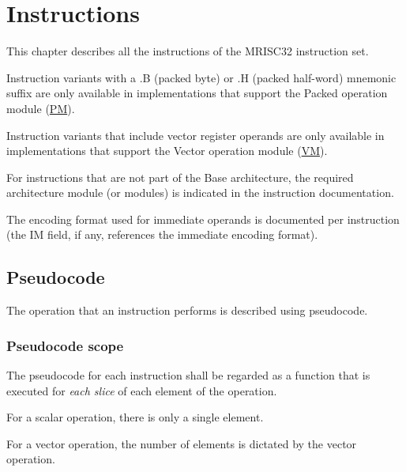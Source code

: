 %

\chapter{Instructions}

This chapter describes all the instructions of the MRISC32 instruction set.

Instruction variants with a .B (packed byte) or .H (packed half-word) mnemonic
suffix are only available in implementations that support the Packed operation
module (\hyperref[module:PM]{PM}).

Instruction variants that include vector register operands are only available
in implementations that support the Vector operation module
(\hyperref[module:VM]{VM}).

For instructions that are not part of the Base architecture, the required
architecture module (or modules) is indicated in the instruction documentation.

The encoding format used for immediate operands is documented per instruction
(the IM field, if any, references the immediate encoding format).

\section{Pseudocode}

The operation that an instruction performs is described using pseudocode.

\subsection{Pseudocode scope}

The pseudocode for each instruction shall be regarded as a function that is
executed for \textit{each slice} of each element of the operation.

For a scalar operation, there is only a single element.

For a vector operation, the number of elements is dictated by the vector
operation.

